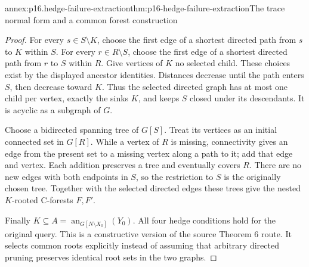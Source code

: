 \begin{annexitem}{annex:p16.hedge-failure-extraction}{thm:p16-hedge-failure-extraction}{The trace normal form and a common forest construction}
\begin{proof}
For every \(s\in S\setminus K\), choose the first edge of
a shortest directed path from \(s\) to \(K\) within \(S\).
For every \(r\in R\setminus S\), choose the first edge of
a shortest directed path from \(r\) to \(S\) within \(R\).
Give vertices of \(K\) no selected child. These choices exist
by the displayed ancestor identities. Distances decrease until the
path enters \(S\), then decrease toward \(K\). Thus the
selected directed graph has at most one child per vertex, exactly
the sinks \(K\), and keeps \(S\) closed under its descendants.
It is acyclic as a subgraph of \(G\).

Choose a bidirected spanning tree of \(G[S]\). Treat its vertices
as an initial connected set in \(G[R]\). While a vertex of
\(R\) is missing, connectivity gives an edge from the present
set to a missing vertex along a path to it; add that edge and
vertex. Each addition preserves a tree and eventually covers \(R\).
There are no new edges with both endpoints in \(S\), so the
restriction to \(S\) is the originally chosen tree. Together
with the selected directed edges these trees give the nested
\(K\)-rooted C-forests \(F,F'\).

Finally \(K\subseteq A=\operatorname{an}_{G[N\setminus X_0]}(Y_0)\).
All four hedge conditions hold for the original query. This is a
constructive version of the source Theorem 6 route. It selects
common roots explicitly instead of assuming that arbitrary directed
pruning preserves identical root sets in the two graphs.
\end{proof}
\end{annexitem}

